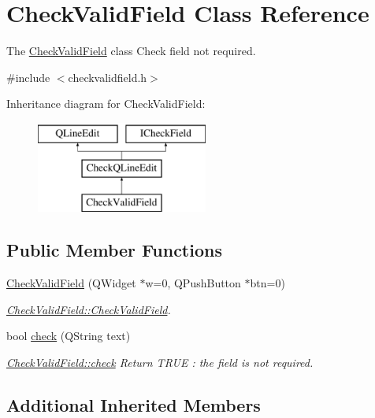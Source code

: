 \hypertarget{classCheckValidField}{\section{Check\+Valid\+Field Class Reference}
\label{classCheckValidField}
}


The \hyperlink{classCheckValidField}{Check\+Valid\+Field} class Check field not required.  




{\ttfamily \#include $<$checkvalidfield.\+h$>$}

Inheritance diagram for Check\+Valid\+Field\+:\begin{figure}[H]
\begin{center}
\leavevmode
\includegraphics[height=3.000000cm]{dc/d93/classCheckValidField}
\end{center}
\end{figure}
\subsection*{Public Member Functions}
\begin{DoxyCompactItemize}
\item 
\hyperlink{classCheckValidField_acfb0bb44b22b5355a227273f439210b8}{Check\+Valid\+Field} (Q\+Widget $\ast$w=0, Q\+Push\+Button $\ast$btn=0)
\begin{DoxyCompactList}\small\item\em \hyperlink{classCheckValidField_acfb0bb44b22b5355a227273f439210b8}{Check\+Valid\+Field\+::\+Check\+Valid\+Field}. \end{DoxyCompactList}\item 
bool \hyperlink{classCheckValidField_a192b1c9c84ea8897661425fd3c0b9e8e}{check} (Q\+String text)
\begin{DoxyCompactList}\small\item\em \hyperlink{classCheckValidField_a192b1c9c84ea8897661425fd3c0b9e8e}{Check\+Valid\+Field\+::check} Return T\+R\+U\+E \+: the field is not required. \end{DoxyCompactList}\end{DoxyCompactItemize}
\subsection*{Additional Inherited Members}


